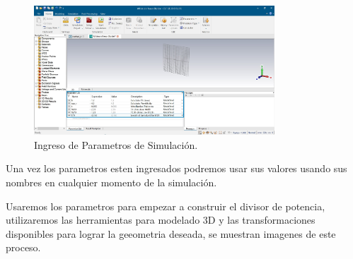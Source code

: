 \documentclass[a4paper]{IEEEtran} %
\begin{document}
\begin{figure}[h]    
    \centering
        \includegraphics[width=9cm]{imagenes/img5}
        \caption{Ingreso de Parametros de Simulación.}
        \label{fig:ingreso_de_parametros}
\end{figure} 
Una vez los parametros esten ingresados podremos usar sus valores usando sus nombres en cualquier momento de la simulación.

Usaremos los parametros para empezar a construir el divisor de potencia, utilizaremos las herramientas para modelado 3D y las transformaciones disponibles para lograr la geeometria deseada, se muestran imagenes de este proceso.
\end{document}
